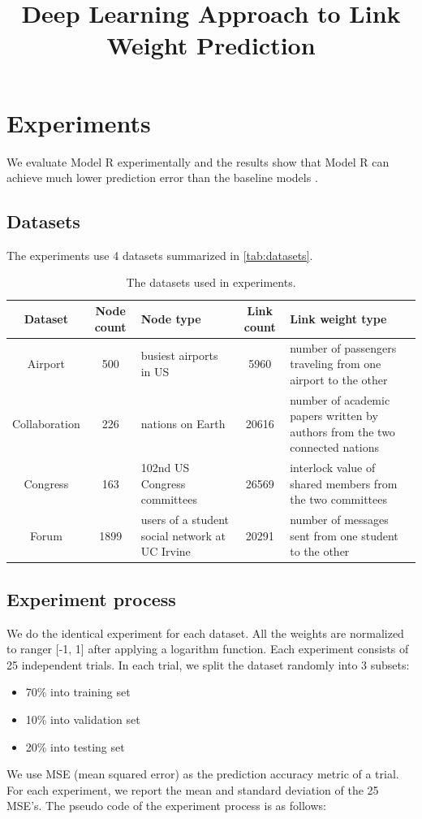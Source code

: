 \documentclass[letterpaper]{article}
\title{Deep Learning Approach to Link Weight Prediction}
\begin{document}
\maketitle


\section{Experiments}
We evaluate Model R experimentally
and the results show that 
Model R can achieve much lower prediction error than the baseline models \cite{aicher2014learning}.

\subsection{Datasets}
The experiments use 4 datasets summarized in \autoref{tab:datasets}.
\begin{table}[!htb]
	\centering
	\caption{The datasets used in experiments.}
	\begin{tabularx}{\textwidth}{|c|c|X|c|X|}  \hline \rowcolor{blue!50}
		Dataset & Node count & Node type & Link count & Link weight type \\ \hline
		Airport\cite{colizza2007reaction} & 500 & busiest airports in US & 5960 & number of passengers traveling from one airport to the other\\ \hline
		Collaboration\cite{pan2012world} & 226 & nations on Earth & 20616 & number of academic papers written by authors from the two connected nations \\ \hline
		Congress\cite{porter2005network} & 163  & 102nd US Congress committees & 26569 & interlock value of shared members from the two committees \\ \hline
		Forum\cite{opsahl2009clustering}  & 1899 & users of a student social network at UC Irvine & 20291 & number of messages sent from one student to the other \\ \hline
	\end{tabularx}
	\label{tab:datasets}
\end{table}

\subsection{Experiment process}
We do the identical experiment for each dataset.
All the weights are normalized to ranger [-1, 1] after applying a logarithm function.
Each experiment consists of 25 independent trials.
In each trial, we split the dataset randomly into 3 subsets:
\begin{itemize}
	\item 70\% into training set
	\item 10\% into validation set
	\item 20\% into testing set
\end{itemize}
We use MSE (mean squared error) as the prediction accuracy metric of a trial.
For each experiment, we report the mean and standard deviation of the 25 MSE's.
The pseudo code of the experiment process is as follows:
\end{document}
